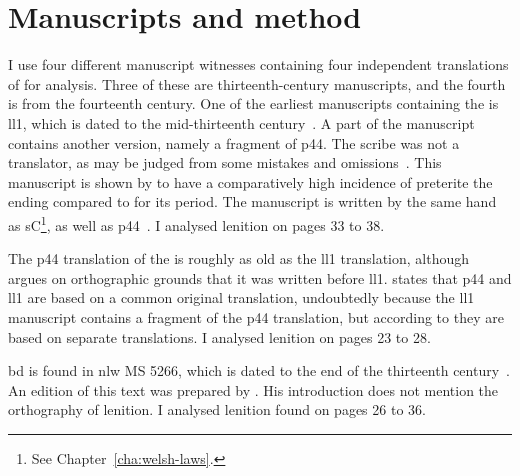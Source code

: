 \section{Manuscripts and method}
\label{sec:manuscripts-method}
I use four different manuscript witnesses containing four independent translations of  for analysis.
Three of these are thirteenth-century manuscripts, and the fourth is from the fourteenth century.
One of the earliest manuscripts containing the  is \acrfull{ll1}, which
is dated to the mid-thirteenth century~\autocite[179]{huws_medieval_2000}.  A part of
the manuscript contains another version, namely a fragment
of \acrshort{p44}. The scribe was not a translator, as may be judged from
some mistakes and omissions~\autocite[xxxvii]{roberts_brut_1971}. This manuscript is shown by \textcite[80--81]{Rod_Datable98} to have a comparatively high incidence of preterite the ending  compared to  for its period.
The manuscript is written by the same hand as \gls{sC}\footnote{See Chapter~\ref{cha:welsh-laws}.}, as well as  \gls{p44}~\autocite[179]{huws_medieval_2000}.
I analysed lenition on pages 33 to 38.

The \acrfull{p44} translation of the  is roughly as old as the \gls{ll1} translation, although \textcite[85]{Rus_Orthography93} argues on orthographic grounds that it was written before \gls{ll1}. 
\Textcite[xix]{Lew_Brut42} states that \gls{p44} and \gls{ll1} are based on a common original translation, undoubtedly because the \gls{ll1} manuscript contains a fragment of the \gls{p44} translation, but according to \textcite[xliii--xliv]{Rob_Astudiaeth69}  they are based on separate translations.
I analysed lenition on pages 23 to 28.

\Acrfull{bd} is found in \gls{nlw} MS 5266, which  is dated to the end of the thirteenth century~\autocite[xliii]{Rob_Astudiaeth69}.
An edition of this text was prepared by \textcite{Lew_Brut42}.
His introduction does not mention the orthography of lenition.
I analysed lenition found on pages 26 to 36.

